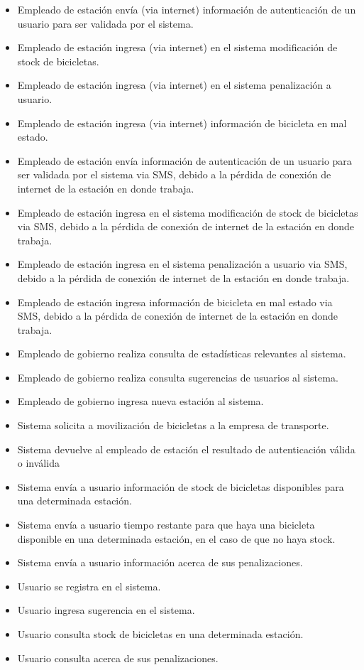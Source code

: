 \begin{itemize}

\item Empleado de estación envía (via internet) información de autenticación de un usuario para ser validada por el sistema.
\item Empleado de estación ingresa (via internet) en el sistema modificación de stock de bicicletas.
\item Empleado de estación ingresa (via internet) en el sistema penalización a usuario.
\item Empleado de estación ingresa (via internet) información de bicicleta en mal estado.
\item Empleado de estación envía información de autenticación de un usuario para ser validada por el sistema via SMS, debido
a la pérdida de conexión de internet de la estación en donde trabaja.
\item Empleado de estación ingresa en el sistema modificación de stock de bicicletas via SMS, debido
a la pérdida de conexión de internet de la estación en donde trabaja.
\item Empleado de estación ingresa en el sistema penalización a usuario via SMS, debido
a la pérdida de conexión de internet de la estación en donde trabaja.
\item Empleado de estación ingresa información de bicicleta en mal estado via SMS, debido
a la pérdida de conexión de internet de la estación en donde trabaja.


\item Empleado de gobierno realiza consulta de estadísticas relevantes al sistema.
\item Empleado de gobierno realiza consulta sugerencias de usuarios al sistema.
\item Empleado de gobierno ingresa nueva estación al sistema.

\item Sistema solicita a movilización de bicicletas a la empresa de transporte.
\item Sistema devuelve al empleado de estación el resultado de autenticación válida o inválida
\item Sistema envía a usuario información de stock de bicicletas disponibles para una determinada estación.
\item Sistema envía a usuario tiempo restante para que haya una bicicleta disponible en una determinada estación, en el caso
de que no haya stock.
\item Sistema envía a usuario información acerca de sus penalizaciones.

\item Usuario se registra en el sistema.
\item Usuario ingresa sugerencia en el sistema.
\item Usuario consulta stock de bicicletas en una determinada estación.
\item Usuario consulta acerca de sus penalizaciones.

\end{itemize}


